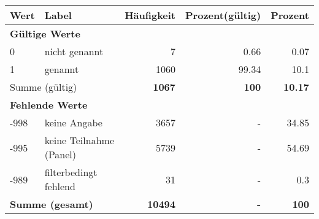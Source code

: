      \begin{longtable}{lXrrr}
     \toprule
     \textbf{Wert} & \textbf{Label} & \textbf{Häufigkeit} & \textbf{Prozent(gültig)} & \textbf{Prozent} \\
     \endhead
     \midrule
     \multicolumn{5}{l}{\textbf{Gültige Werte}}\\

     0 &
     \multicolumn{1}{X}{ nicht genannt   } &


       \num{7} &
       \num[round-mode=places,round-precision=2]{0.66} &
         \num[round-mode=places,round-precision=2]{0.07} \\

     1 &
     \multicolumn{1}{X}{ genannt   } &


       \num{1060} &
       \num[round-mode=places,round-precision=2]{99.34} &
         \num[round-mode=places,round-precision=2]{10.1} \\
     \midrule
     \multicolumn{2}{l}{Summe (gültig)} &
       \textbf{\num{1067}} &
     \textbf{\num{100}} &
       \textbf{\num[round-mode=places,round-precision=2]{10.17}} \\
     \multicolumn{5}{l}{\textbf{Fehlende Werte}}\\
       -998 &
       keine Angabe &
         \num{3657} &
        - &
         \num[round-mode=places,round-precision=2]{34.85} \\
       -995 &
       keine Teilnahme (Panel) &
         \num{5739} &
        - &
         \num[round-mode=places,round-precision=2]{54.69} \\
       -989 &
       filterbedingt fehlend &
         \num{31} &
        - &
         \num[round-mode=places,round-precision=2]{0.3} \\
     \midrule
     \multicolumn{2}{l}{\textbf{Summe (gesamt)}} &
          \textbf{\num{10494}} &
        \textbf{-} &
        \textbf{\num{100}} \\
     \bottomrule
     \end{longtable}
     
